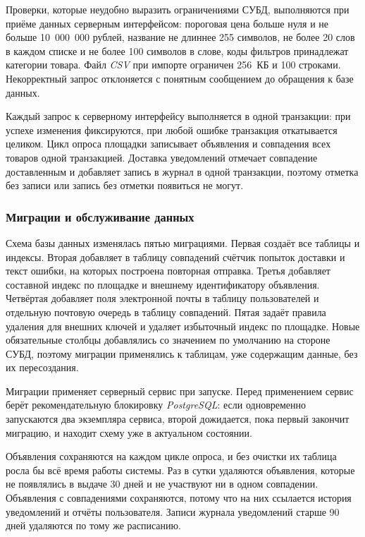 Проверки, которые неудобно выразить ограничениями СУБД, выполняются при приёме данных серверным интерфейсом: пороговая цена больше нуля и не больше 10~000~000 рублей, название не длиннее 255 символов, не более 20 слов в каждом списке и не более 100 символов в слове, коды фильтров принадлежат категории товара. Файл \textit{CSV} при импорте ограничен 256~КБ и 100 строками. Некорректный запрос отклоняется с понятным сообщением до обращения к базе данных.

Каждый запрос к серверному интерфейсу выполняется в одной транзакции: при успехе изменения фиксируются, при любой ошибке транзакция откатывается целиком. Цикл опроса площадки записывает объявления и совпадения всех товаров одной транзакцией. Доставка уведомлений отмечает совпадение доставленным и добавляет запись в журнал в одной транзакции, поэтому отметка без записи или запись без отметки появиться не могут.

\subsubsection{Миграции и обслуживание данных}

Схема базы данных изменялась пятью миграциями. Первая создаёт все таблицы и индексы. Вторая добавляет в таблицу совпадений счётчик попыток доставки и текст ошибки, на которых построена повторная отправка. Третья добавляет составной индекс по площадке и внешнему идентификатору объявления. Четвёртая добавляет поля электронной почты в таблицу пользователей и отдельную почтовую очередь в таблицу совпадений. Пятая задаёт правила удаления для внешних ключей и удаляет избыточный индекс по площадке. Новые обязательные столбцы добавлялись со значением по умолчанию на стороне СУБД, поэтому миграции применялись к таблицам, уже содержащим данные, без их пересоздания.

Миграции применяет серверный сервис при запуске. Перед применением сервис берёт рекомендательную блокировку \textit{PostgreSQL}: если одновременно запускаются два экземпляра сервиса, второй дожидается, пока первый закончит миграцию, и находит схему уже в актуальном состоянии.

Объявления сохраняются на каждом цикле опроса, и без очистки их таблица росла бы всё время работы системы. Раз в сутки удаляются объявления, которые не появлялись в выдаче 30 дней и не участвуют ни в одном совпадении. Объявления с совпадениями сохраняются, потому что на них ссылается история уведомлений и отчёты пользователя. Записи журнала уведомлений старше 90 дней удаляются по тому же расписанию.

